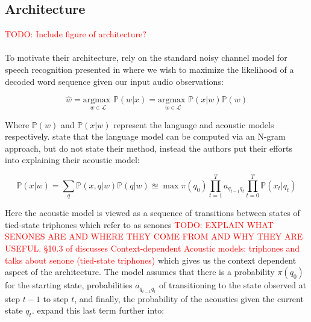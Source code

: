 \documentclass[letterpaper]{article}
\newcommand{\TODO}[1]{\textcolor{red}{TODO: #1}}
\newcommand{\argmax}[1]{\underset{#1}{\text{argmax }}}
\newcommand{\cprob}[2]{ \prob{#1 \lvert #2} }
\newcommand{\prob}[1]{\mathbb{P}\left( #1 \right)}
\begin{document}
\subsection*{Architecture}

\TODO{Include figure of architecture?}

\paragraph{} To motivate their architecture, \cite{DBLP:journals/taslp/DahlYDA12} rely on the standard noisy channel model for speech recognition presented in \cite{jurafskyMartin} where we wish to maximize the likelihood of a decoded word sequence given our input audio observations:

\begin{equation}
\hat{w} = \argmax{w \in \mathscr{L}} \cprob{w}{x} = \argmax{w \in \mathscr{L}} \cprob{x}{w} \prob{w} 
\label{eqn:asr:def}
\end{equation}

Where $\prob{w}$ and $\cprob{x}{w}$ represent the language and acoustic models respectively. \cite{jurafskyMartin} state that the language model can be computed via an N-gram approach, but \cite{DBLP:journals/taslp/DahlYDA12} do not state their method, instead the authors put their efforts into explaining their acoustic model:

\begin{equation}
\cprob{x}{w} = \sum_{q} \cprob{x,q}{w} \cprob{q}{w} \approxeq \max \pi(q_0) \prod_{t = 1}^T a_{q_{t-1} q_t} \prod_{t=0}^T \cprob{x_t}{q_t} 
\label{eqn:lm:def}
\end{equation}

Here the acoustic model is viewed as a sequence of transitions between states of tied-state triphones which \cite{DBLP:journals/taslp/DahlYDA12} refer to as senones \TODO{EXPLAIN WHAT SENONES ARE AND WHERE THEY COME FROM AND WHY THEY ARE USEFUL. \S 10.3 of \cite{jurafskyMartin} discusses Context-dependent Acoustic models: triphones and \cite{DBLP:conf/interspeech/2014} talks about senone (tied-state triphones)} which gives us the context dependent aspect of the architecture. The model assumes that there is a probability $\pi(q_0)$ for the starting state, probabilities $a_{q_{t-1} q_{t}}$ of transitioning to the state observed at step $t -1$ to step $t$, and finally, the probability of the acoustics given the current state $q_t$. \cite{DBLP:journals/taslp/DahlYDA12} expand this last term further into:
\end{document}
